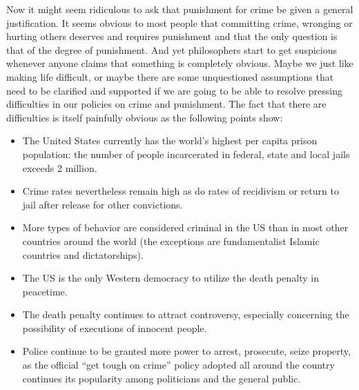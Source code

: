 \documentclass[
  12pt, openany]{book}
\providecommand{\tightlist}{%
  \setlength{\itemsep}{0pt}\setlength{\parskip}{0pt}}
\theoremstyle{definition}
\theoremstyle{definition}
\theoremstyle{definition}
\theoremstyle{definition}
\theoremstyle{remark}
\begin{document}
Now it might seem ridiculous to ask that punishment for crime be given a general justification. It seems obvious to most people that committing crime, wronging or hurting others deserves and requires punishment and that the only question is that of the degree of punishment. And yet philosophers start to get suspicious whenever anyone claims that something is completely obvious. Maybe we just like making life difficult, or maybe there are some unquestioned assumptions that need to be clarified and supported if we are going to be able to resolve pressing difficulties in our policies on crime and punishment. The fact that there are difficulties is itself painfully obvious as the following points show:

\begin{itemize}
\tightlist
\item
  The United States currently has the world's highest per capita prison population: the number of people incarcerated in federal, state and local jails exceeds 2 million.
\item
  Crime rates nevertheless remain high as do rates of recidivism or return to jail after release for other convictions.
\item
  More types of behavior are considered criminal in the US than in most other countries around the world (the exceptions are fundamentalist Islamic countries and dictatorships).
\item
  The US is the only Western democracy to utilize the death penalty in peacetime.
\item
  The death penalty continues to attract controversy, especially concerning the possibility of executions of innocent people.
\item
  Police continue to be granted more power to arrest, prosecute, seize property, as the official ``get tough on crime'' policy adopted all around the country continues its popularity among politicians and the general public.
\end{itemize}
\end{document}
